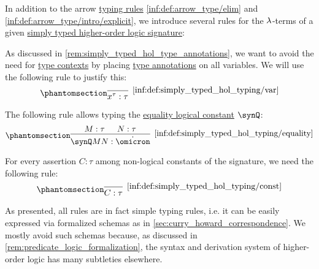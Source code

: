 \begin{definition}\label{def:simply_typed_hol_typing}\mimprovised
  In addition to the arrow \hyperref[con:typing_rule]{typing rules} \ref{inf:def:arrow_type/elim} and \ref{inf:def:arrow_type/intro/explicit}, we introduce several rules for the \( {\mathrm \lambda} \)-terms of a given \hyperref[def:simply_typed_hol_signature]{simply typed higher-order logic signature}:
  \begin{thmenum}
     As discussed in \cref{rem:simply_typed_hol_type_annotations}, we want to avoid the need for \hyperref[def:type_context]{type contexts} by placing \hyperref[con:type_annotation]{type annotations} on all variables. We will use the following rule to justify this:
    \begin{equation*}\taglabel[\ensuremath{ \logic{Var} }]{inf:def:simply_typed_hol_typing/var}
      \begin{prooftree}
        \infer0[\ref{inf:def:simply_typed_hol_typing/var}]{ x^\tau: \tau }
      \end{prooftree}
    \end{equation*}

     The following rule allows typing the \hyperref[def:simply_typed_hol_signature/const]{equality logical constant} \( \synQ \):
    \begin{equation*}\taglabel[\ensuremath{ Q_+ }]{inf:def:simply_typed_hol_typing/equality}
      \begin{prooftree}
        \hypo{ M: \tau }
        \hypo{ N: \tau }
        \infer2[\ref{inf:def:simply_typed_hol_typing/equality}]{ \synQ M N: \syn\omicron }
      \end{prooftree}
    \end{equation*}

     For every assertion \( C: \tau \) among non-logical constants of the signature, we need the following rule:
    \begin{equation*}\taglabel[\ensuremath{ \logic{Ax}_C }]{inf:def:simply_typed_hol_typing/const}
      \begin{prooftree}
        \infer0[\ref{inf:def:simply_typed_hol_typing/const}]{ C: \tau }
      \end{prooftree}
    \end{equation*}
  \end{thmenum}
\end{definition}
\begin{comments}
  \item As presented, all rules are in fact simple typing rules, i.e. it can be easily expressed via formalized schemas as in \cref{sec:curry_howard_correspondence}. We mostly avoid such schemas because, as discussed in \cref{rem:predicate_logic_formalization}, the syntax and derivation system of higher-order logic has many subtleties elsewhere.
\end{comments}

